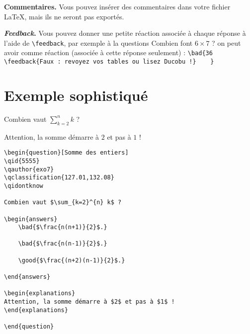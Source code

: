 \documentclass[12pt,a4paper]{article}
\begin{document}
\bigskip
\textbf{Commentaires.} Vous pouvez insérer des commentaires dans votre fichier \LaTeX, mais ils ne seront pas exportés. 

\bigskip
\textbf{\emph{Feedback}.} Vous pouvez donner une petite réaction associée à chaque réponse à l'aide de \verb|\feedback|, par exemple à la questions \og{}Combien font $6\times 7$ ?\fg{} on peut avoir comme réaction (associée à cette réponse seulement) : 
\verb|\bad{36 \feedback{Faux : revoyez vos tables ou lisez Ducobu !}	}|



\section{Exemple sophistiqué}

\begin{center}
\begin{minipage}{0.8\textwidth}
\begin{question}
\qidontknow

Combien vaut $\sum_{k=2}^{n} k$ ?

\begin{answers}
    
    
\end{answers}

\begin{explanations}
Attention, la somme démarre à $2$ et pas à $1$ !
\end{explanations}

\end{question}
\end{minipage}
\end{center}

\begin{center}
\begin{minipage}{0.8\textwidth}
\begin{verbatim}
\begin{question}[Somme des entiers]
\qid{5555}
\qauthor{exo7}
\qclassification{127.01,132.08}
\qidontknow

Combien vaut $\sum_{k=2}^{n} k$ ?

\begin{answers}
    \bad{$\frac{n(n+1)}{2}$.}
    
    \bad{$\frac{n(n-1)}{2}$.} 
    
    \good{$\frac{(n+2)(n-1)}{2}$.}        

\end{answers}

\begin{explanations}
Attention, la somme démarre à $2$ et pas à $1$ !
\end{explanations}

\end{question}
\end{verbatim}
\end{minipage}
\end{center}
\end{document}

